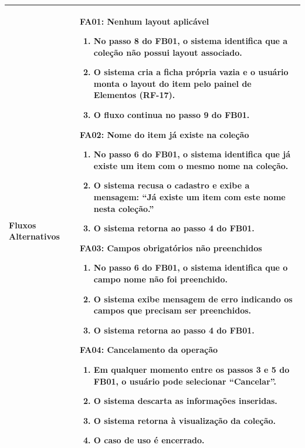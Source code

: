 \begin{longtable}{ >{\raggedright}p{2.8cm} | >{\raggedright\arraybackslash}p{10.7cm} }
Fluxos Alternativos & \mbox{}
\textbf{FA01:} Nenhum layout aplicável
\vspace{2pt}
\begin{enumerate}[nosep,leftmargin=1.2em,topsep=0pt,partopsep=0pt,parsep=0pt,itemsep=0pt,after=\vspace{2pt}]
	\item No passo 8 do FB01, o sistema identifica que a coleção não possui layout associado.
	\item O sistema cria a ficha própria vazia e o usuário monta o layout do item pelo painel de Elementos (RF-17).
	\item O fluxo continua no passo 9 do FB01.
\end{enumerate}

\textbf{FA02:} Nome do item já existe na coleção
\vspace{2pt}
\begin{enumerate}[nosep,leftmargin=1.2em,topsep=0pt,partopsep=0pt,parsep=0pt,itemsep=0pt,after=\vspace{2pt}]
	\item No passo 6 do FB01, o sistema identifica que já existe um item com o mesmo nome na coleção.
	\item O sistema recusa o cadastro e exibe a mensagem: ``Já existe um item com este nome nesta coleção.''
	\item O sistema retorna ao passo 4 do FB01.
\end{enumerate}

\textbf{FA03:} Campos obrigatórios não preenchidos
\vspace{2pt}
\begin{enumerate}[nosep,leftmargin=1.2em,topsep=0pt,partopsep=0pt,parsep=0pt,itemsep=0pt,after=\vspace{2pt}]
	\item No passo 6 do FB01, o sistema identifica que o campo nome não foi preenchido.
	\item O sistema exibe mensagem de erro indicando os campos que precisam ser preenchidos.
	\item O sistema retorna ao passo 4 do FB01.
\end{enumerate}

\textbf{FA04:} Cancelamento da operação
\vspace{2pt}
\begin{enumerate}[nosep,leftmargin=1.2em,topsep=0pt,partopsep=0pt,parsep=0pt,itemsep=0pt,after=\vspace{2pt}]
	\item Em qualquer momento entre os passos 3 e 5 do FB01, o usuário pode selecionar ``Cancelar''.
	\item O sistema descarta as informações inseridas.
	\item O sistema retorna à visualização da coleção.
	\item O caso de uso é encerrado.
\end{enumerate}
\mbox{} \\ \hline


\end{longtable}
